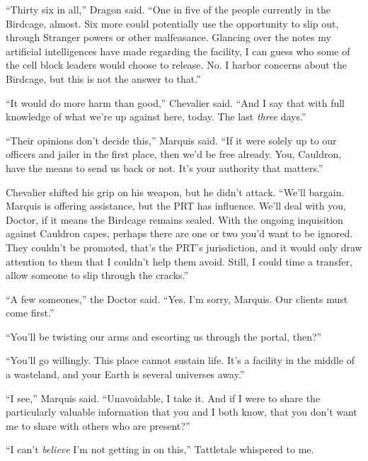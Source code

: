 ``Thirty six in all,'' Dragon said.  ``One in five of the people currently in the Birdcage, almost.  Six more could potentially use the opportunity to slip out, through Stranger powers or other malfeasance.  Glancing over the notes my artificial intelligences have made regarding the facility, I can guess who some of the cell block leaders would choose to release.  No.  I harbor concerns about the Birdcage, but this is not the answer to that.''



``It would do more harm than good,'' Chevalier said.  ``And I say that with full knowledge of what we're up against here, today.  The last \emph{three }days.''



``Their opinions don't decide this,'' Marquis said.  ``If it were solely up to our officers and jailer in the first place, then we'd be free already.  You, Cauldron, have the means to send us back or not.  It's your authority that matters.''



Chevalier shifted his grip on his weapon, but he didn't attack.  ``We'll bargain.  Marquis is offering assistance, but the PRT has influence.  We'll deal with you, Doctor, if it means the Birdcage remains sealed.  With the ongoing inquisition against Cauldron capes, perhaps there are one or two you'd want to be ignored.  They couldn't be promoted, that's the PRT's jurisdiction, and it would only draw attention to them that I couldn't help them avoid.  Still, I could time a transfer, allow someone to slip through the cracks.''



``A few someones,'' the Doctor said.  ``Yes.  I'm sorry, Marquis.  Our clients must come first.''



``You'll be twisting our arms and escorting us through the portal, then?''



``You'll go willingly.  This place cannot sustain life.  It's a facility in the middle of a wasteland, and your Earth is several universes away.''



``I see,'' Marquis said.  ``Unavoidable, I take it.  And if I were to share the particularly valuable information that you and I both know, that you don't want me to share with others who are present?''



``I can't \emph{believe} I'm not getting in on this,'' Tattletale whispered to me.



